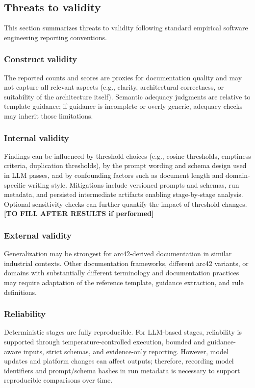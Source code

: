 \subsection{Threats to validity}
\label{sec:discussion_validity}

This section summarizes threats to validity following standard empirical software engineering reporting conventions.

\subsubsection{Construct validity}
The reported counts and scores are proxies for documentation quality and may not capture all relevant aspects (e.g., clarity, architectural correctness, or suitability of the architecture itself). Semantic adequacy judgments are relative to template guidance; if guidance is incomplete or overly generic, adequacy checks may inherit those limitations.

\subsubsection{Internal validity}
Findings can be influenced by threshold choices (e.g., cosine thresholds, emptiness criteria, duplication thresholds), by the prompt wording and schema design used in LLM passes, and by confounding factors such as document length and domain-specific writing style. Mitigations include versioned prompts and schemas, run metadata, and persisted intermediate artifacts enabling stage-by-stage analysis. Optional sensitivity checks can further quantify the impact of threshold changes. \textbf{[TO FILL AFTER RESULTS if performed]}

\subsubsection{External validity}
Generalization may be strongest for arc42-derived documentation in similar industrial contexts. Other documentation frameworks, different arc42 variants, or domains with substantially different terminology and documentation practices may require adaptation of the reference template, guidance extraction, and rule definitions.

\subsubsection{Reliability}
Deterministic stages are fully reproducible. For LLM-based stages, reliability is supported through temperature-controlled execution, bounded and guidance-aware inputs, strict schemas, and evidence-only reporting. However, model updates and platform changes can affect outputs; therefore, recording model identifiers and prompt/schema hashes in run metadata is necessary to support reproducible comparisons over time.


